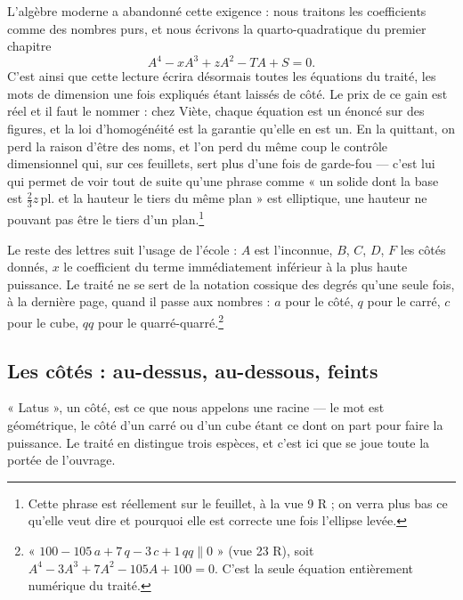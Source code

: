\documentclass[11pt,a4paper]{article}
\begin{document}
L'algèbre moderne a abandonné cette exigence : nous traitons les coefficients
comme des nombres purs, et nous écrivons la quarto-quadratique du premier
chapitre
\[ A^4 - x A^3 + z A^2 - T A + S = 0. \]
C'est ainsi que cette lecture écrira désormais toutes les équations du traité,
les mots de dimension une fois expliqués étant laissés de côté. Le prix de ce
gain est réel et il faut le nommer : chez Viète, chaque équation est un énoncé
sur des figures, et la loi d'homogénéité est la garantie qu'elle en est un. En
la quittant, on perd la raison d'être des noms, et l'on perd du même coup le
contrôle dimensionnel qui, sur ces feuillets, sert plus d'une fois de garde-fou —
c'est lui qui permet de voir tout de suite qu'une phrase comme « un solide dont
la base est $\tfrac23 z\,\mathrm{pl.}$ et la hauteur le tiers du même plan » est
elliptique, une hauteur ne pouvant pas être le tiers d'un plan.\footnote{Cette
phrase est réellement sur le feuillet, à la vue 9 R ; on verra plus bas ce
qu'elle veut dire et pourquoi elle est correcte une fois l'ellipse levée.}

Le reste des lettres suit l'usage de l'école : $A$ est l'inconnue, $B$, $C$,
$D$, $F$ les côtés donnés, $x$ le coefficient du terme immédiatement inférieur
à la plus haute puissance. Le traité ne se sert de la notation cossique des
degrés qu'une seule fois, à la dernière page, quand il passe aux nombres : $a$
pour le côté, $q$ pour le carré, $c$ pour le cube, $qq$ pour le
quarré-quarré.\footnote{« $100 - 105\,a + 7\,q - 3\,c + 1\,qq \parallel 0$ »
(vue 23 R), soit $A^4 - 3A^3 + 7A^2 - 105A + 100 = 0$. C'est la seule équation
entièrement numérique du traité.}

\subsection*{Les côtés : au-dessus, au-dessous, feints}

« Latus », un côté, est ce que nous appelons une racine — le mot est
géométrique, le côté d'un carré ou d'un cube étant ce dont on part pour faire la
puissance. Le traité en distingue trois espèces, et c'est ici que se joue toute
la portée de l'ouvrage.
\end{document}
